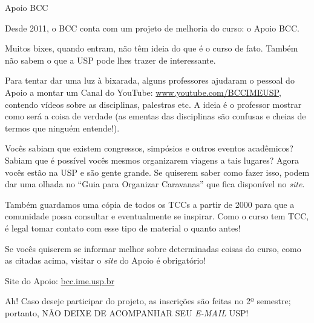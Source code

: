 \begin{subsubsecao}{Apoio BCC}

Desde 2011, o BCC conta com um projeto de melhoria do curso: o Apoio BCC.

Muitos bixes, quando entram, não têm ideia do que é o curso de fato. Também não
sabem o que a USP pode lhes trazer de interessante.

Para tentar dar uma luz à bixarada, alguns professores ajudaram o pessoal do
Apoio a montar um Canal do YouTube: \url{www.youtube.com/BCCIMEUSP}, contendo
vídeos sobre as disciplinas, palestras etc. A ideia é o professor mostrar como
será a coisa de verdade (as ementas das disciplinas são confusas e cheias de
termos que ninguém entende!).

Vocês sabiam que existem congressos, simpósios e outros eventos acadêmicos?
Sabiam que é possível vocês mesmos organizarem viagens a tais lugares? Agora
vocês estão na USP e são gente grande. Se quiserem saber como fazer isso, podem 
dar uma olhada no ``Guia para Organizar Caravanas'' que fica disponível 
no \textit{site}.

Também guardamos uma cópia de todos os TCCs a partir de 2000 para que a 
comunidade possa consultar e eventualmente se inspirar. Como o curso tem TCC, é 
legal tomar contato com esse tipo de material o quanto antes!

Se vocês quiserem se informar melhor sobre determinadas coisas do curso, como as
citadas acima, visitar o \textit{site} do Apoio é obrigatório!

Site do Apoio: \url{bcc.ime.usp.br}

Ah! Caso deseje participar do projeto, as inscrições são feitas no 2º 
semestre; portanto, NÃO DEIXE DE ACOMPANHAR SEU \textit{E-MAIL} USP!

\end{subsubsecao}
